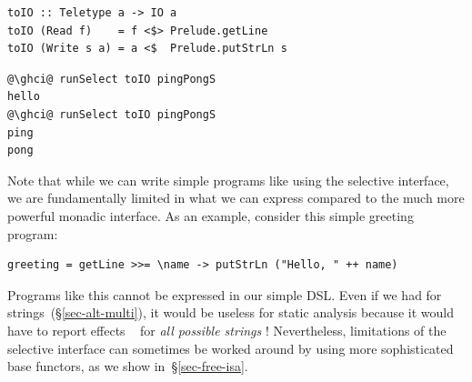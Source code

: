 \vspace{1mm}
\begin{verbatim}
toIO :: Teletype a -> IO a
toIO (Read f)    = f <$> Prelude.getLine
toIO (Write s a) = a <$  Prelude.putStrLn s
\end{verbatim}
\vspace{0mm}
\begin{verbatim}
@\ghci@ runSelect toIO pingPongS
hello
@\ghci@ runSelect toIO pingPongS
ping
pong
\end{verbatim}
\vspace{1mm}

\noindent
Note that while we can write simple programs like  using the
selective interface, we are fundamentally limited in what we can express
compared to the much more powerful monadic interface. As an example, consider
this simple greeting program:

\vspace{1mm}
\begin{verbatim}
greeting = getLine >>= \name -> putStrLn ("Hello, " ++ name)
\end{verbatim}
\vspace{1mm}

\noindent
Programs like this cannot be expressed in our simple  DSL. Even if
we had  for strings~(\S\ref{sec-alt-multi}), it would be useless for
static analysis because it would have to report effects ~ for
\emph{all possible strings} ! Nevertheless, limitations of the
selective interface can sometimes be worked around by using more sophisticated
base functors, as we show in~\S\ref{sec-free-isa}.



